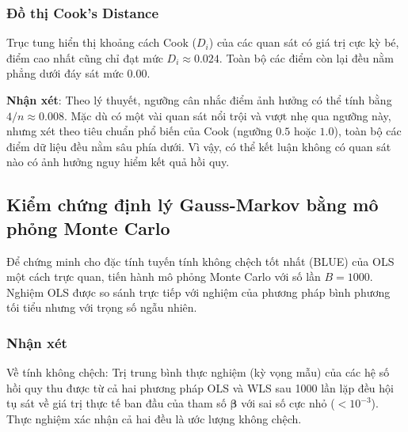 \subsubsection{Đồ thị Cook's Distance}

Trục tung hiển thị khoảng cách Cook ($D_i$) của các quan sát có giá trị cực kỳ bé, điểm cao nhất cũng chỉ đạt mức $D_i \approx 0.024$. Toàn bộ các điểm còn lại đều nằm phẳng dưới đáy sát mức $0.00$.

\textbf{Nhận xét}: Theo lý thuyết, ngưỡng cân nhắc điểm ảnh hưởng có thể tính bằng $4/n \approx 0.008$. Mặc dù có một vài quan sát nổi trội và vượt nhẹ qua ngưỡng này, nhưng xét theo tiêu chuẩn phổ biến của Cook (ngưỡng $0.5$ hoặc $1.0$), toàn bộ các điểm dữ liệu đều nằm sâu phía dưới. Vì vậy, có thể kết luận không có quan sát nào có ảnh hưởng nguy hiểm kết quả hồi quy.

\subsection{Kiểm chứng định lý Gauss-Markov bằng mô phỏng Monte Carlo}

Để chứng minh cho đặc tính tuyến tính không chệch tốt nhất (BLUE) của OLS một cách trực quan, tiến hành mô phỏng Monte Carlo với số lần $B = 1000$. Nghiệm OLS được so sánh trực tiếp với nghiệm của phương pháp bình phương tối tiểu nhưng với trọng số ngẫu nhiên.

\subsubsection{Nhận xét}

Về tính không chệch: Trị trung bình thực nghiệm (kỳ vọng mẫu) của các hệ số hồi quy thu được từ cả hai phương pháp OLS và WLS sau 1000 lần lặp đều hội tụ sát về giá trị thực tế ban đầu của tham số $\boldsymbol{\beta}$ với sai số cực nhỏ ($< 10^{-3}$). Thực nghiệm xác nhận cả hai đều là ước lượng không chệch.

